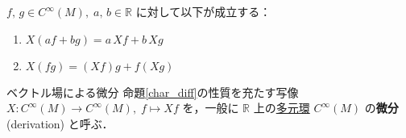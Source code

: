 \documentclass[geometry_main]{subfiles}
\begin{document}
\begin{myprop}[label=char_diff]{}
	$f,\, g \in C^\infty (M),\; a,\, b \in \mathbb{R}$ に対して以下が成立する：
	\begin{enumerate}
		\item $X(af + bg) = a\, Xf + b\, Xg$
		\item $X(fg) = (Xf) g + f (Xg)$
	\end{enumerate}
\end{myprop}

\begin{mydef}[label=def.d]{ベクトル場による微分}
	命題\ref{char_diff}の性質を充たす写像 $X \colon C^\infty (M) \to C^\infty (M),\; f \mapsto Xf$ を，一般に $\mathbb{R}$ 上の\hyperref[ax.alg]{多元環} $C^\infty (M)$ の\textbf{微分} (derivation) と呼ぶ．
\end{mydef}





\end{document}
